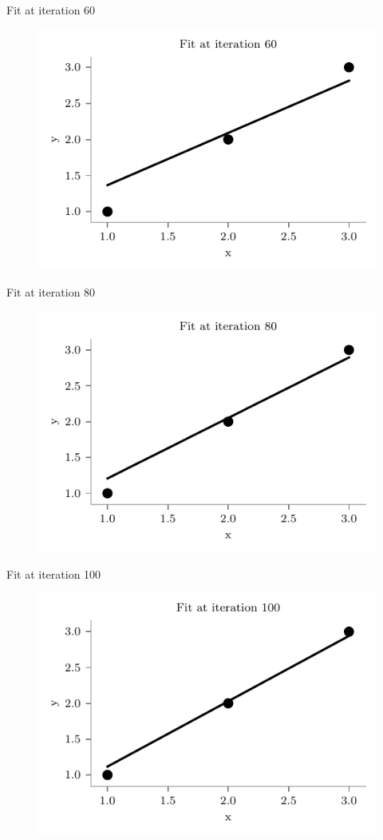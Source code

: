 \documentclass{beamer}
\begin{document}
	
\begin{frame}{Fit at iteration 60}
\begin{figure}
	\centering
	\includegraphics[width=0.7\linewidth]{gradient-descent/fit-iteration-60.pdf}
\end{figure}
\end{frame}

\begin{frame}{Fit at iteration 80}
\begin{figure}
	\centering
	\includegraphics[width=0.7\linewidth]{gradient-descent/fit-iteration-80.pdf}
\end{figure}
\end{frame}

\begin{frame}{Fit at iteration 100}
\begin{figure}
	\centering
	\includegraphics[width=0.7\linewidth]{gradient-descent/fit-iteration-100.pdf}
\end{figure}
\end{frame}
\end{document}
